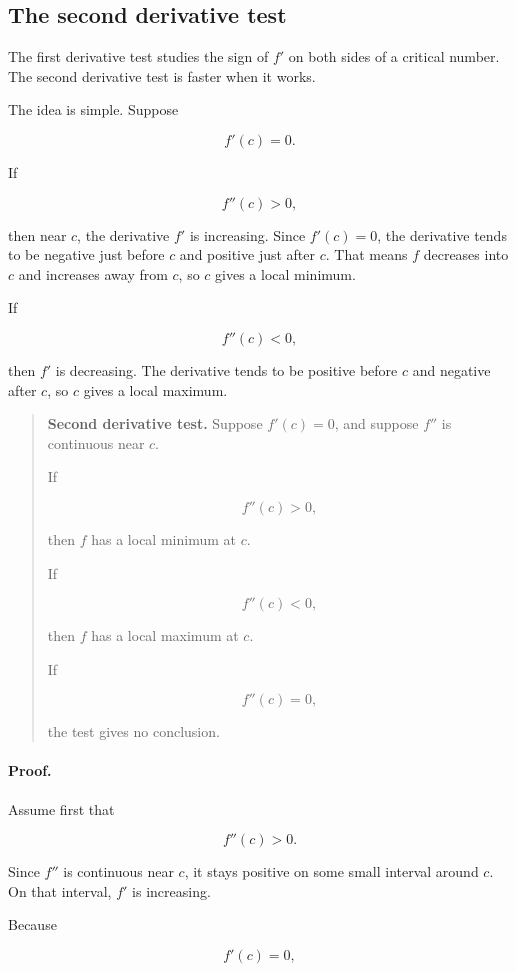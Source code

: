 \subsection{The second derivative test}
\label{subsec:second-derivative-test}

The first derivative test studies the sign of \(f'\) on both sides of a critical number.
The second derivative test is faster when it works.

The idea is simple.  Suppose

\[
f'(c)=0.
\]

If

\[
f''(c)>0,
\]

then near \(c\), the derivative \(f'\) is increasing.  Since \(f'(c)=0\), the derivative
tends to be negative just before \(c\) and positive just after \(c\).  That means \(f\)
decreases into \(c\) and increases away from \(c\), so \(c\) gives a local minimum.

If

\[
f''(c)<0,
\]

then \(f'\) is decreasing.  The derivative tends to be positive before \(c\) and negative
after \(c\), so \(c\) gives a local maximum.

\begin{quote}
\textbf{Second derivative test.}
Suppose \(f'(c)=0\), and suppose \(f''\) is continuous near \(c\).

If

\[
f''(c)>0,
\]

then \(f\) has a local minimum at \(c\).

If

\[
f''(c)<0,
\]

then \(f\) has a local maximum at \(c\).

If

\[
f''(c)=0,
\]

the test gives no conclusion.
\end{quote}

\paragraph{Proof.}
Assume first that

\[
f''(c)>0.
\]

Since \(f''\) is continuous near \(c\), it stays positive on some small interval around
\(c\).  On that interval, \(f'\) is increasing.

Because

\[
f'(c)=0,
\]

